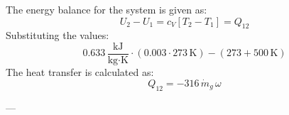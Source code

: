 The energy balance for the system is given as:  
\[
U_2 - U_1 = c_V \left[ T_2 - T_1 \right] = Q_{12}
\]  
Substituting the values:  
\[
0.633 \, \frac{\text{kJ}}{\text{kg·K}} \cdot \left( 0.003 \cdot 273 \, \text{K} \right) - \left( 273 + 500 \, \text{K} \right)
\]  
The heat transfer is calculated as:  
\[
Q_{12} = -316 \, \dot{m}_g \, \omega
\]

---